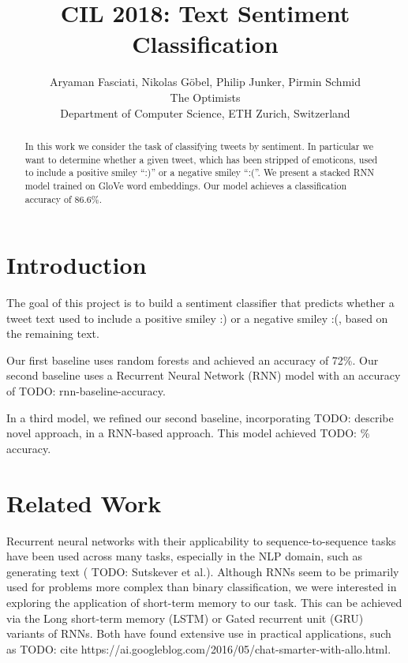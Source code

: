 \documentclass[10pt,conference,compsocconf]{IEEEtran}
\newcommand{\todo}[1]{}
\renewcommand{\todo}[1]{{\color{red} TODO: {#1}}}
\begin{document}
\title{CIL 2018: Text Sentiment Classification}

\author{
  Aryaman Fasciati, Nikolas G\"obel, Philip Junker, Pirmin Schmid\\
  The Optimists\\
  Department of Computer Science, ETH Zurich, Switzerland
}

\maketitle

\begin{abstract}
  In this work we consider the task of classifying tweets by
  sentiment. In particular we want to determine whether a given tweet,
  which has been stripped of emoticons, used to include a positive
  smiley ``:)'' or a negative smiley ``:(''. We present a stacked RNN
  model trained on GloVe word embeddings. Our model achieves a
  classification accuracy of 86.6\%.
\end{abstract}


\section{Introduction}

The goal of this project is to build a sentiment classifier that
predicts whether a tweet text used to include a positive smiley :) or
a negative smiley :(, based on the remaining text.

Our first baseline uses random forests and achieved an accuracy of
72\%. Our second baseline uses a Recurrent Neural Network (RNN) model
with an accuracy of \todo{rnn-baseline-accuracy}.

In a third model, we refined our second baseline, incorporating
\todo{describe novel approach}, in a RNN-based approach. This model
achieved \todo{\%} accuracy.


\section{Related Work}

Recurrent neural networks with their applicability to
sequence-to-sequence tasks have been used across many tasks,
especially in the NLP domain, such as generating text (\todo{Sutskever
  et al.}). Although RNNs seem to be primarily used for problems more
complex than binary classification, we were interested in exploring
the application of short-term memory to our task. This can be achieved
via the Long short-term memory (LSTM) or Gated recurrent unit (GRU)
variants of RNNs. Both have found extensive use in practical
applications, such as \todo{cite
  https://ai.googleblog.com/2016/05/chat-smarter-with-allo.html}.
\end{document}
